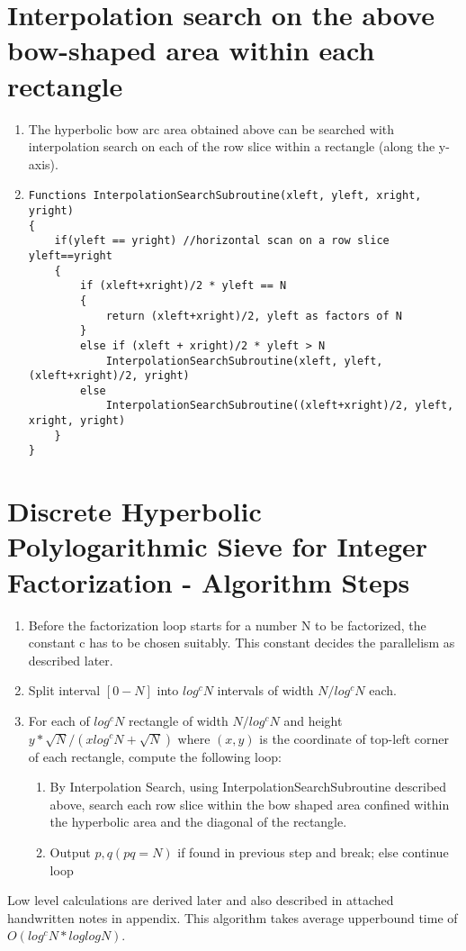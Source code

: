 \documentclass[11pt,onecolumn]{article}
\begin{document}
\section{Interpolation search on the above bow-shaped area within each rectangle}
\begin{enumerate}
\item The hyperbolic bow arc area obtained above can be searched with interpolation search on each of the row slice within a rectangle (along the y-axis).
\item \begin{verbatim}
Functions InterpolationSearchSubroutine(xleft, yleft, xright, yright)
{
	if(yleft == yright) //horizontal scan on a row slice yleft==yright
	{
		if (xleft+xright)/2 * yleft == N
		{
			return (xleft+xright)/2, yleft as factors of N
		}
		else if (xleft + xright)/2 * yleft > N
			InterpolationSearchSubroutine(xleft, yleft, (xleft+xright)/2, yright)
		else
			InterpolationSearchSubroutine((xleft+xright)/2, yleft, xright, yright)
	}
}
\end{verbatim}
\end{enumerate}

\section{Discrete Hyperbolic Polylogarithmic Sieve for Integer Factorization - Algorithm Steps}
\begin{enumerate}
\item Before the factorization loop starts for a number N to be factorized, the constant c has to be chosen suitably. This constant decides the parallelism as described later.
\item Split interval $[0-N]$ into $log^{c}N$ intervals of width $N/log^{c}N$ each.
\item For each of $log^{c}N$ rectangle of width $N/log^{c}N$ and height $y*\sqrt{N}/(xlog^{c}N + \sqrt{N})$ where $(x,y)$ is the coordinate of top-left corner of each rectangle, compute the following loop:
\begin{enumerate}
\item By Interpolation Search, using InterpolationSearchSubroutine described above, search each row slice within the bow shaped area confined within the hyperbolic area and the diagonal of the rectangle.
\item Output $p,q (pq=N)$ if found in previous step and break; else continue loop
\end{enumerate}
\end{enumerate}
Low level calculations are derived later and also described in attached handwritten notes in appendix. This algorithm takes average upperbound time of $O(log^{c}N * loglogN)$.
\end{document}
